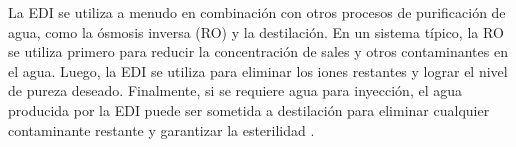 La EDI se utiliza a menudo en combinación con otros procesos de purificación de agua, como la ósmosis inversa (RO) y la destilación.
En un sistema típico, la RO se utiliza primero para reducir la concentración de sales y otros contaminantes en el agua. Luego, la EDI
se utiliza para eliminar los iones restantes y lograr el nivel de pureza deseado. Finalmente, si se requiere agua para inyección,
el agua producida por la EDI puede ser sometida a destilación para eliminar cualquier contaminante restante y garantizar la esterilidad \cite{condorchemUltrapureWaterElectrodeionization2019}.

